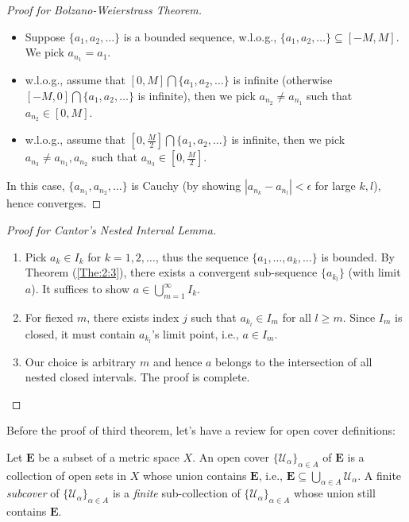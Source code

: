 \begin{proof}[Proof for Bolzano-Weierstrass Theorem]
\quad

\begin{itemize}
\item
Suppose $\{a_1,a_2,\dots\}$ is a bounded sequence, w.l.o.g., $\{a_1,a_2,\dots\}\subseteq[-M,M]$. We pick $a_{n_1} = a_1$.
\item
w.l.o.g., assume that $[0,M]\bigcap\{a_1,a_2,\dots\}$ is infinite (otherwise $[-M,0]\bigcap\{a_1,a_2,\dots\}$ is infinite), then we pick $a_{n_2}\ne a_{n_1}$ such that $a_{n_2}\in[0,M]$.
\item
w.l.o.g., assume that $[0,\frac{M}{2}]\bigcap\{a_1,a_2,\dots\}$ is infinite, then we pick $a_{n_3}\ne a_{n_1},a_{n_2}$ such that $a_{n_3}\in[0,\frac{M}{2}]$.
\end{itemize}
In this case, $\{a_{n_1},a_{n_2},\dots\}$ is Cauchy (by showing $|a_{n_k}-a_{n_l}|<\epsilon$ for large $k,l$), hence converges.
\end{proof}
\begin{proof}[Proof for Cantor's Nested Interval Lemma]\quad

\begin{enumerate}
\item
Pick $a_k\in I_k$ for $k=1,2,\dots$, thus the sequence $\{a_1,\dots,a_k,\dots\}$ is bounded. By Theorem (\ref{The:2:3}), there exists a convergent sub-sequence $\{a_{k_l}\}$ (with limit $a$). It suffices to show $a\in\bigcup_{m=1}^\infty I_k$. 
\item
For fiexed $m$, there exists index $j$ such that $a_{k_l}\in I_m$ for all $l\ge m$. Since $I_m$ is closed, it must contain $a_{k_l}$'s limit point, i.e., $a\in I_m$.
\item
Our choice is arbitrary $m$ and hence $a$ belongs to the intersection of all nested closed intervals. The proof is complete.
\end{enumerate}

\end{proof}
Before the proof of third theorem, let's have a review for open cover definitions:
\begin{definition}
Let $\bm E$ be a subset of a metric space $X$. An open cover $\{\mathcal{U}_\alpha\}_{\alpha\in A}$ of $\bm E$ is a collection of open sets in $X$ whose union contains $\bm E$, i.e., $\bm E\subseteq\bigcup_{\alpha\in A}\mathcal{U}_\alpha$. A finite \emph{subcover} of $\{\mathcal{U}_\alpha\}_{\alpha\in A}$ is a \emph{finite} sub-collection of $\{\mathcal{U}_\alpha\}_{\alpha\in A}$ whose union still contains $\bm E$.
\end{definition}
